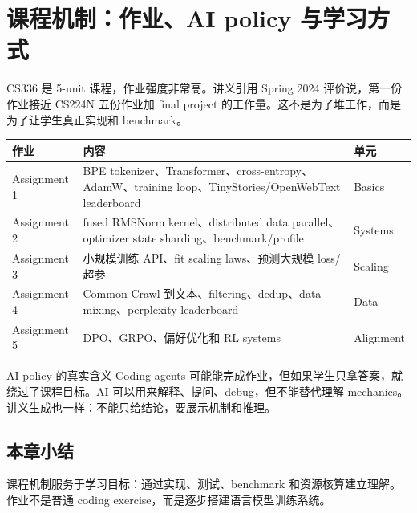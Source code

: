 \section{课程机制：作业、AI policy 与学习方式}

CS336 是 5-unit 课程，作业强度非常高。讲义引用 Spring 2024 评价说，第一份作业接近 CS224N 五份作业加 final project 的工作量。这不是为了堆工作，而是为了让学生真正实现和 benchmark。

\begin{longtable}{p{}p{}p{}}
\toprule
\textbf{作业} & \textbf{内容} & \textbf{单元} \\
\midrule
Assignment 1 & BPE tokenizer、Transformer、cross-entropy、AdamW、training loop、TinyStories/OpenWebText leaderboard & Basics \\
Assignment 2 & fused RMSNorm kernel、distributed data parallel、optimizer state sharding、benchmark/profile & Systems \\
Assignment 3 & 小规模训练 API、fit scaling laws、预测大规模 loss/超参 & Scaling \\
Assignment 4 & Common Crawl 到文本、filtering、dedup、data mixing、perplexity leaderboard & Data \\
Assignment 5 & DPO、GRPO、偏好优化和 RL systems & Alignment \\
\bottomrule
\end{longtable}

\begin{warningbox}{AI policy 的真实含义}
Coding agents 可能能完成作业，但如果学生只拿答案，就绕过了课程目标。AI 可以用来解释、提问、debug，但不能替代理解 mechanics。讲义生成也一样：不能只给结论，要展示机制和推理。
\end{warningbox}

\subsection{本章小结}

课程机制服务于学习目标：通过实现、测试、benchmark 和资源核算建立理解。作业不是普通 coding exercise，而是逐步搭建语言模型训练系统。

